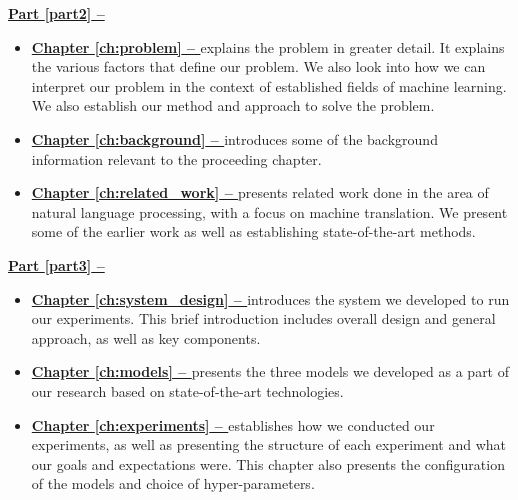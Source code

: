 \vspace{0.5cm}\noindent
\begin{minipage}{\linewidth}
    \textbf{{\hyperref[part2]{Part \ref{part2} -- }}}
    \begin{itemize}
        \item\textbf{\hyperref[ch:problem]{Chapter \ref{ch:problem} -- }} explains the problem in greater detail. It explains the various factors that define our problem. We also look into how we can interpret our problem in the context of established fields of machine learning. We also establish our method and approach to solve the problem.
        \item\textbf{\hyperref[ch:background]{Chapter \ref{ch:background} -- }} introduces some of the background information relevant to the proceeding chapter.
        \item\textbf{\hyperref[ch:related_work]{Chapter \ref{ch:related_work} -- }} presents related work done in the area of natural language processing, with a focus on machine translation. We present some of the earlier work as well as establishing state-of-the-art methods.
    \end{itemize}
\end{minipage}

\vspace{0.5cm}\noindent
\begin{minipage}{\linewidth}
    \textbf{{\hyperref[part3]{Part \ref{part3} -- }}}
    \begin{itemize}
        \item\textbf{\hyperref[ch:system_design]{Chapter \ref{ch:system_design} -- }} introduces the system we developed to run our experiments. This brief introduction includes overall design and general approach, as well as key components.
        \item\textbf{\hyperref[ch:models]{Chapter \ref{ch:models} -- }} presents the three models we developed as a part of our research based on state-of-the-art technologies.
        \item\textbf{\hyperref[ch:experiments]{Chapter \ref{ch:experiments} -- }} establishes how we conducted our experiments, as well as presenting the structure of each experiment and what our goals and expectations were. This chapter also presents the configuration of the models and choice of hyper-parameters.
    \end{itemize}
\end{minipage}

